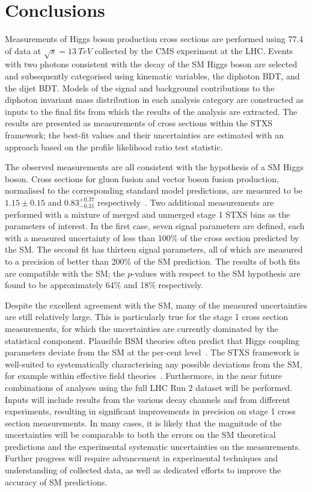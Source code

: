 \chapter{Conclusions}
\label{chap:conclusions}

Measurements of Higgs boson production cross sections are performed using \SI{77.4}{\fbinv} of 
data at $\sqrt{s} = \SI{13}{TeV}$ collected by the CMS experiment at the LHC.
Events with two photons consistent with the decay of the SM Higgs boson are selected
and subsequently categorised using kinematic variables, the diphoton BDT, and the dijet BDT.
Models of the signal and background contributions to the diphoton invariant mass distribution 
in each analysis category are constructed as inputs to the final fits 
from which the results of the analysis are extracted.
The results are presented as measurements of cross sections within the STXS framework;
the best-fit values and their uncertainties are estimated with an approach 
based on the profile likelihood ratio test statistic.

The observed measurements are all consistent with the hypothesis of a SM Higgs boson.
Cross sections for gluon fusion and vector boson fusion production, 
normalised to the corresponding standard model predictions,
are measured to be $1.15 \pm 0.15$ and $0.83_{-0.31}^{+0.37}$ respectively~\cite{HIG-18-029}.
Two additional measurements are performed with a mixture of merged and unmerged 
stage 1 STXS bins as the parameters of interest.
In the first case, seven signal parameters are defined, 
each with a measured uncertainty of less than 100\% of the cross section predicted by the SM.
The second fit has thirteen signal parameters, all of which are measured to a precision 
of better than 200\% of the SM prediction.
The results of both fits are compatible with the SM; the $p$-values with respect to the SM hypothesis
are found to be approximately 64\% and 18\% respectively.

Despite the excellent agreement with the SM, 
many of the measured uncertainties are still relatively large.
This is particularly true for the stage 1 cross section measurements, 
for which the uncertainties are currently dominated by the statistical component.
Plausible BSM theories often predict that Higgs coupling parameters 
deviate from the SM at the per-cent level~\cite{Snowmass}.
The STXS framework is well-suited to systematically characterising 
any possible deviations from the SM, for example within effective field theories~\cite{STXStoEFT}.
Furthermore, 
in the near future combinations of analyses using the full LHC Run 2 dataset will be performed.
Inputs will include results from the various decay channels and from different experiments, 
resulting in significant improvements in precision on stage 1 cross section measurements.
In many cases, it is likely that the magnitude of the uncertainties will be comparable to both 
the errors on the SM theoretical predictions 
and the experimental systematic uncertainties on the measurements.
Further progress will require advancement in experimental techniques 
and understanding of collected data, 
as well as dedicated efforts to improve the accuracy of SM predictions.

